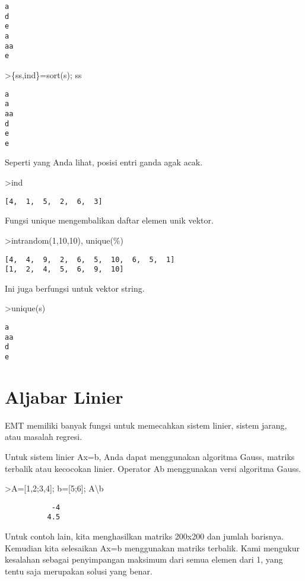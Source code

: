\documentclass[
]{book}
\begin{document}
\begin{verbatim}
a
d
e
a
aa
e
\end{verbatim}

\textgreater\{ss,ind\}=sort(s); ss

\begin{verbatim}
a
a
aa
d
e
e
\end{verbatim}

Seperti yang Anda lihat, posisi entri ganda agak acak.

\textgreater ind

\begin{verbatim}
[4,  1,  5,  2,  6,  3]
\end{verbatim}

Fungsi unique mengembalikan daftar elemen unik vektor.

\textgreater intrandom(1,10,10), unique(\%)

\begin{verbatim}
[4,  4,  9,  2,  6,  5,  10,  6,  5,  1]
[1,  2,  4,  5,  6,  9,  10]
\end{verbatim}

Ini juga berfungsi untuk vektor string.

\textgreater unique(s)

\begin{verbatim}
a
aa
d
e
\end{verbatim}

\chapter{Aljabar Linier}\label{aljabar-linier}

EMT memiliki banyak fungsi untuk memecahkan sistem linier, sistem jarang, atau masalah regresi.

Untuk sistem linier Ax=b, Anda dapat menggunakan algoritma Gauss, matriks terbalik atau kecocokan linier. Operator Ab menggunakan versi algoritma Gauss.

\textgreater A={[}1,2;3,4{]}; b={[}5;6{]}; A\textbackslash b

\begin{verbatim}
           -4 
          4.5 
\end{verbatim}

Untuk contoh lain, kita menghasilkan matriks 200x200 dan jumlah barisnya. Kemudian kita selesaikan Ax=b menggunakan matriks terbalik. Kami mengukur kesalahan sebagai penyimpangan maksimum dari semua elemen dari 1, yang tentu saja merupakan solusi yang benar.
\end{document}
